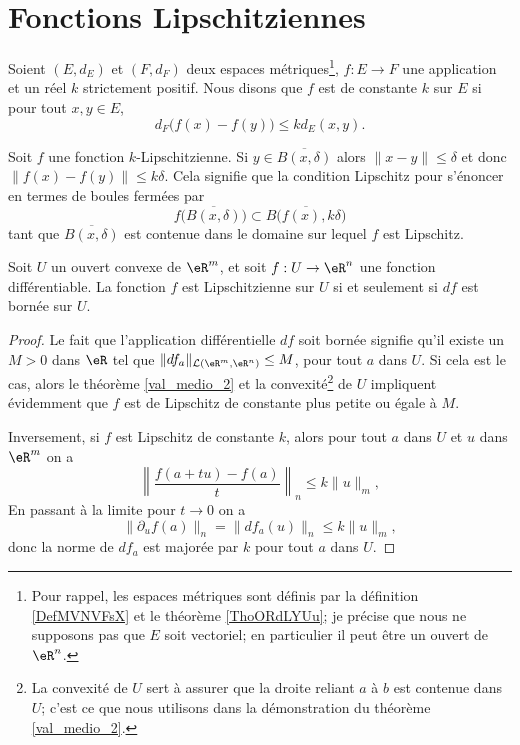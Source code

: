 \section{Fonctions Lipschitziennes}


\begin{definition}      \label{DEFooQHVEooDbYKmz}
    Soient \( (E,d_E)\) et \( (F,d_F)\) deux espaces métriques\footnote{Pour rappel, les espaces métriques sont définis par la définition \ref{DefMVNVFsX} et le théorème \ref{ThoORdLYUu}; je précise que nous ne supposons pas que \( E\) soit vectoriel; en particulier il peut être un ouvert de \( \eR^n\).}, \( f\colon E\to F\) une application et un réel \( k\) strictement positif. Nous disons que \( f\) est  de constante $k$ sur \( E\) si pour tout \( x,y\in E\),
    \begin{equation}
        d_F\big( f(x)-f(y) \big)\leq kd_E(x,y).
    \end{equation}
\end{definition}
Soit \( f\) une fonction \( k\)-Lipschitzienne. Si \( y\in \overline{ B(x,\delta)}\) alors \( \| x-y \|\leq\delta\) et donc \( \big\| f(x)-f(y) \big\|\leq k\delta\). Cela signifie que la condition Lipschitz pour s'énoncer en termes de boules fermées par
\begin{equation}    \label{EqDZvtUbn}
    f\big( \overline{ B(x,\delta) } \big)\subset \overline{  B\big( f(x),k\delta \big) }
\end{equation}
tant que \( \overline{ B(x,\delta) } \) est contenue dans le domaine sur lequel \( f\) est Lipschitz.

\begin{proposition}
  Soit  $U$ un ouvert convexe  de $\eR^m$, et soit $f:U\to \eR^n$ une fonction différentiable. La fonction $f$ est Lipschitzienne sur $U$ si et seulement si $df$ est bornée sur $U$.  
\end{proposition}
\begin{proof}
	Le fait que l'application différentielle $df$ soit bornée signifie qu'il existe un $M>0$ dans $\eR$ tel que $\|df_a\|_{\mathcal{L}(\eR^m,\eR^n)}\leq M$, pour tout $a$ dans $U$. Si cela est le cas, alors le théorème \ref{val_medio_2} et la convexité\footnote{La convexité de $U$ sert à assurer que la droite reliant $a$ à $b$ est contenue dans $U$; c'est ce que nous utilisons dans la démonstration du théorème \ref{val_medio_2}.} de $U$ impliquent évidemment que $f$ est de Lipschitz de constante plus petite ou égale à $M$.
	
	Inversement, si $f$ est Lipschitz de constante $k$, alors pour tout $a$ dans $U$ et $u$ dans $\eR^m$ on a 
	\[
		\left\|\frac{f(a+tu)-f(a)}{t}\right\|_n\leq k \|u\|_m,
	\]   
	En passant à la limite pour $t\to 0$ on a 
	\[
		\|\partial_u f(a)\|_n=\|df_a(u)\|_n\leq k \|u\|_m,
	\]
	donc la norme de $df_a$ est majorée par $k$ pour tout $a$ dans $U$.   
\end{proof}

